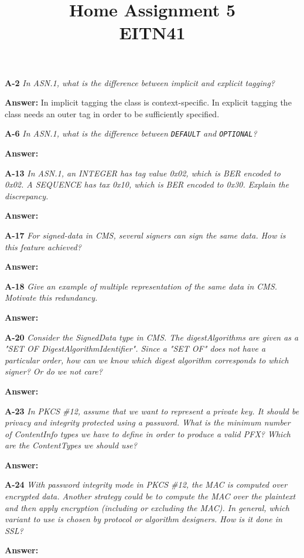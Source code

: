 \documentclass[a4paper]{article}
\title{Home Assignment 5 \\ EITN41}
\author{}
\date{}
\newcommand{\Q}[2]{ \vspace{10pt} \textbf{A-#1} \textit{#2} }
\newcommand{\A}[1]{ \textbf{Answer:} #1 }
\begin{document}
\maketitle

\Q{2} {
    In ASN.1, what is the difference between implicit and explicit tagging?
}

\A{
    In implicit tagging the class is context-specific.
    In explicit tagging the class needs an outer tag in order to be
    sufficiently specified.
}

\Q{6} {
    In ASN.1, what is the difference between \texttt{DEFAULT} and 
    \texttt{OPTIONAL}?
}

\A{
}

\Q{13} {
    In ASN.1, an INTEGER has tag value 0x02, which is BER encoded to 0x02.
    A SEQUENCE has tax 0x10, which is BER encoded to 0x30.
    Explain the discrepancy.
}

\A{}

\Q{17} {
    For signed-data in CMS, several signers can sign the same data. 
    How is this feature achieved?
}

\A{
}

\Q{18} {
    Give an example of multiple representation of the same data in CMS.
    Motivate this redundancy.
}

\A{
}

\Q{20} {
    Consider the SignedData type in CMS. 
    The digestAlgorithms are given as a "SET OF DigestAlgorithmIdentifier".
    Since a "SET OF" does not have a particular order, how can we know 
    which digest algorithm corresponds to which signer? Or do we not care?
}

\A{
}

\Q{23} {
    In PKCS \#12, assume that we want to represent a private key. 
    It should be privacy and integrity protected using a password. 
    What is the minimum number of ContentInfo types we have to define
    in order to produce a valid PFX? Which are the ContentTypes we should use?
}

\A{
}

\Q{24} {
    With password integrity mode in PKCS \#12, the MAC is computed over 
    encrypted data. Another strategy could be to compute the MAC over 
    the plaintext and then apply encryption (including or excluding
    the MAC). In general, which variant to use is chosen by protocol or 
    algorithm designers. How is it done in SSL?
}

\A{
}
\end{document}
